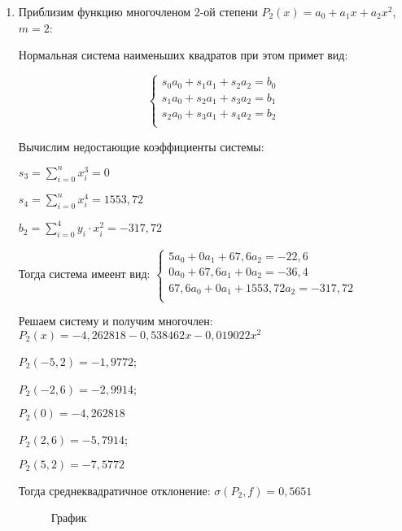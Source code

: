 \documentclass[a4paper,12pt]{article} %
\begin{document}
\begin{enumerate}
\item Приблизим функцию многочленом 2-ой степени $P_2(x) = a_0 + a_1x + a_2x^2$, $m = 2$:

Нормальная система наименьших квадратов при этом примет вид:

$$
\begin{cases}
    s_0 a_0 + s_1 a_1 + s_2 a_2 = b_0 \\
    s_1 a_0 + s_2 a_1 + s_3 a_2 = b_1 \\
    s_2 a_0 + s_3 a_1 + s_4 a_2 = b_2 \\
\end{cases}
$$

Вычислим недостающие коэффициенты системы: 
\begin{center}
    $s_3 = \sum_{i = 0}^{n}x_i^3 = 0$
    
    $s_4 = \sum_{i = 0}^{n}x_i^4 = 1553,72$
    
    $b_2 = \sum_{i = 0}^{4} y_i \cdot x_i^2 = -317,72$
\end{center}

Тогда система имеент вид:
$
\begin{cases}
    5a_0 + 0a_1 + 67,6a_2 = -22,6 \\
    0 a_0 + 67,6a_1 + 0a_2 = -36,4 \\
    67,6a_0 + 0a_1 + 1553,72a_2 = -317,72 \\
\end{cases}
$

Решаем систему и получим многочлен: $P_2(x) = -4,262818 - 0,538462x - 0,019022x^2$
\begin{center}
    $P_2(-5,2) = -1,9772$; 

    $P_2(-2,6) = -2,9914$; 

    $P_2(0) = -4,262818$

    $P_2(2,6) = -5,7914$; 

    $P_2(5,2) = -7,5772$
\end{center}

Тогда среднеквадратичное отклонение: $\sigma(P_2, f) = 0,5651$

\begin{figure}[h]
\caption{График}
\label{fig:image}
\end{figure}


\end{enumerate}
\end{document}

